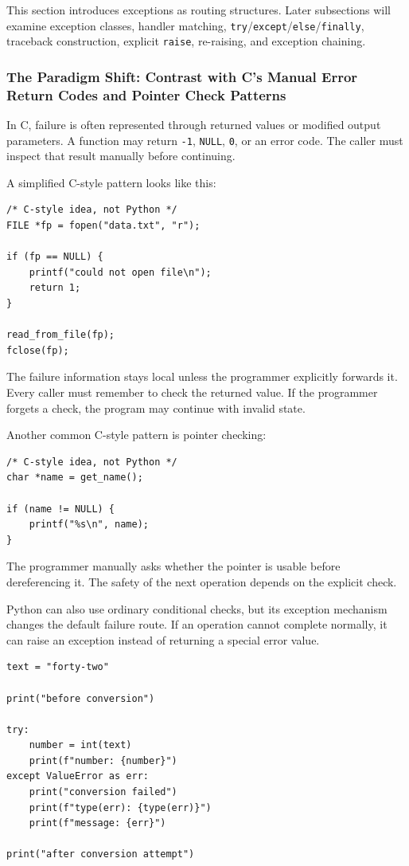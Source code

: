 \documentclass[a4paper,twoside]{report}
\begin{document}
This section introduces exceptions as routing structures. Later subsections will examine exception classes, handler matching, \texttt{try}/\texttt{except}/\texttt{else}/\texttt{finally}, traceback construction, explicit \texttt{raise}, re-raising, and exception chaining.

\subsubsection{The Paradigm Shift: Contrast with C's Manual Error Return Codes and Pointer Check Patterns}

In C, failure is often represented through returned values or modified output parameters. A function may return \texttt{-1}, \texttt{NULL}, \texttt{0}, or an error code. The caller must inspect that result manually before continuing.

A simplified C-style pattern looks like this:

\begin{verbatim}
/* C-style idea, not Python */
FILE *fp = fopen("data.txt", "r");

if (fp == NULL) {
    printf("could not open file\n");
    return 1;
}

read_from_file(fp);
fclose(fp);
\end{verbatim}

The failure information stays local unless the programmer explicitly forwards it. Every caller must remember to check the returned value. If the programmer forgets a check, the program may continue with invalid state.

Another common C-style pattern is pointer checking:

\begin{verbatim}
/* C-style idea, not Python */
char *name = get_name();

if (name != NULL) {
    printf("%s\n", name);
}
\end{verbatim}

The programmer manually asks whether the pointer is usable before dereferencing it. The safety of the next operation depends on the explicit check.

Python can also use ordinary conditional checks, but its exception mechanism changes the default failure route. If an operation cannot complete normally, it can raise an exception instead of returning a special error value.

\begin{verbatim}
text = "forty-two"

print("before conversion")

try:
    number = int(text)
    print(f"number: {number}")
except ValueError as err:
    print("conversion failed")
    print(f"type(err): {type(err)}")
    print(f"message: {err}")

print("after conversion attempt")
\end{verbatim}
\end{document}
